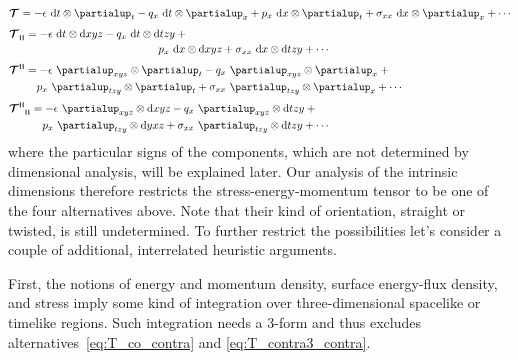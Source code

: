 \documentclass[\ifafour a4paper,12pt,\else a5paper,10pt,\fi%
onecolumn,oneside,article,%
british%
]{memoir}
\makeatletter
\theoremstyle{remark}
\theoremstyle{innote}
\newcommand*{\de}{\partialup}%
\newcommand*{\di}{\mathrm{d}}%
\renewcommand*{\|}[1][]{\nonscript\,#1\vert\nonscript\;\mathopen{}}
\newcommand*{\q}{}%
\DeclareRobustCommand*{\q}{%
  \mathord{\mathpalette\bigcdot@{}}%
}
\newcommand*{\bigcdot@scalefactor}{0.7}
\newcommand*{\bigcdot@widthfactor}{1.5}
\newcommand*{\bigcdot@}[2]{%
  \sbox0{$#1\vcenter{}$}%
  \sbox2{$#1\cdot\m@th$}%
  \hbox to \bigcdot@widthfactor\wd2{%
    \hfil
    \raise\ht0\hbox{%
      \scalebox{\bigcdot@scalefactor}{%
        \lower\ht0\hbox{$#1\bullet\m@th$}%
      }%
    }%
    \hfil
  }%
}
\newcommand*{\yT}{\bm{\mathcal{T}}}
\renewcommand*{\i}{\indices}
\newcommand*{\en}{\epsilon}
\newcommand*{\yq}{q}
\newcommand*{\yp}{p}
\newcommand*{\yt}{\sigma}
\newcommand*{\rul}{{\mkern2mu\rule[-0.1ex]{0.75pt}{1.1ex}\mkern2mu}}
\DeclarePairedDelimiter\mul{\rul}{\rul}%
\makeatother
\begin{document}
\begin{subequations}
  \label{eq:T_alternatives}
  \begin{align}
    \label{eq:T_co_contra}
    &\yT\i{_{\q}^{\q}} = -\en\  \di t\otimes\de_{t} 
      -\yq_{x}\  \di t\otimes\de_{x} +
      \yp_{x}\  \di x\otimes\de_{t} +
      \yt_{x x}\  \di x\otimes\de_{x} + \dotsb
    \\[\jot]
    \label{eq:T_co_co3}
    &\!\begin{multlined}[b][0.85\textwidth]
      \yT\i{_{\q\mul{\q\q\q}}} =
      -\en\  \di t\otimes\di xyz 
      -\yq_{x}\  \di t\otimes\di tzy +{}\\
      \yp_{x}\  \di x\otimes\di xyz 
      +\yt_{x x}\  \di x\otimes\di tzy + \dotsb
    \end{multlined}
    \\[\jot]
    \label{eq:T_contra3_contra}
    &\!\begin{multlined}[b][0.85\textwidth]
      \yT\i{^{\mul{\q\q\q}\q}} = -\en\  \de_{xyz} \otimes\de_{t} 
      -\yq_{x}\  \de_{xyz}\otimes\de_{x} +{}\\
      \yp_{x}\  \de_{tzy} \otimes\de_{t} +
      \yt_{x x}\  \de_{tzy}\otimes\de_{x} + \dotsb
    \end{multlined}
    \\[\jot]
    \label{eq:T_contra3_co3}
    &\!\begin{multlined}[b][0.85\textwidth]
      \yT\i{^{\mul{\q\q\q}}_{\mul{\q\q\q}}} = -\en\  \de_{xyz} \otimes\di xyz 
      -\yq_{x}\  \de_{xyz}\otimes\di tzy +{}\\
      \yp_{x}\  \de_{tzy} \otimes\di yxz 
      + \yt_{x x}\  \de_{tzy}\otimes\di tzy
      + \dotsb
    \end{multlined}
  \end{align}
\end{subequations}
where the particular signs of the components, which are not determined by
dimensional analysis, will be explained later. Our analysis of the
intrinsic dimensions therefore restricts the stress-energy-momentum tensor
to be one of the four alternatives above. Note that their kind of
orientation, straight or twisted, is still undetermined. To further
restrict the possibilities let's consider a couple of additional,
interrelated heuristic arguments.

First, the notions of energy and momentum density, surface energy-flux
density, and stress imply some kind of integration over three-dimensional
spacelike or timelike regions. Such integration needs a 3-form and thus
excludes alternatives~\eqref{eq:T_co_contra} and
\eqref{eq:T_contra3_contra}.
\end{document}
